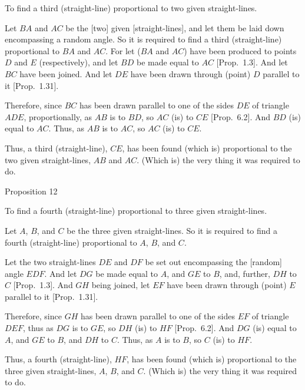 To find a third (straight-line) proportional to two
given straight-lines.

Let $BA$ and $AC$ be the [two] given [straight-lines], and let them be laid
down encompassing a random angle. So it is required to find
a third (straight-line) proportional to $BA$ and $AC$. For let ($BA$ and $AC$) have
been produced to points $D$ and $E$ (respectively), and let $BD$ be made equal
to $AC$  [Prop.~1.3]. And let $BC$ have been joined. And let $DE$ have been drawn
through (point) $D$ parallel to it [Prop.~1.31].

Therefore, since $BC$
has been drawn parallel to one of the sides $DE$ of triangle $ADE$, proportionally, as $AB$ is to $BD$, so $AC$ (is) to $CE$ [Prop.~6.2]. And $BD$ (is) equal to $AC$.
Thus, as $AB$ is to $AC$, so $AC$ (is) to $CE$.

\epsfysize=2.5in
\centerline{}

Thus, a third (straight-line), $CE$, has been found (which is) proportional to the two
given straight-lines, $AB$ and $AC$. (Which is) the very thing it was required to
do.


\begin{center}
{\large Proposition 12}
\end{center}

To find a fourth (straight-line) proportional
to three given straight-lines.

\epsfysize=2.2in
\centerline{}

Let $A$, $B$, and $C$ be the three given straight-lines. So it is required
to find a fourth (straight-line) proportional to $A$, $B$, and $C$.

Let the two straight-lines $DE$ and $DF$ be set out encompassing the
[random] angle $EDF$. And let $DG$ be made equal to $A$, and $GE$ to $B$,
and, further, $DH$ to $C$  [Prop.~1.3]. And $GH$ being joined, 
let $EF$ have been drawn through (point) $E$ parallel to it  [Prop.~1.31].

Therefore, since $GH$ has been drawn parallel to one of the sides $EF$ of 
triangle $DEF$, thus as $DG$ is to $GE$, so $DH$ (is) to $HF$ [Prop.~6.2]. And $DG$ (is) equal to $A$, and
$GE$ to $B$, and $DH$ to $C$. Thus, as $A$ is to $B$, so $C$ (is) to $HF$.

Thus, a fourth (straight-line), $HF$, has been found (which is) proportional to the three given
straight-lines, $A$, $B$, and $C$. (Which is) the very thing it was required to
do.

